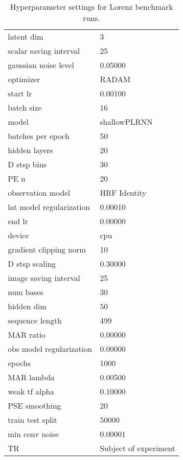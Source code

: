 \begin{table}
\centering
\caption{Hyperparameter settings for Lorenz benchmark runs.}
\label{tab:args lorenz runs}
\begin{tabular}{ll}
\toprule
\midrule
latent dim & 3 \\
scalar saving interval & 25 \\
gaussian noise level & 0.05000 \\
optimizer & RADAM \\
start lr & 0.00100 \\
batch size & 16 \\
model & shallowPLRNN \\
batches per epoch & 50 \\
hidden layers & 20 \\
D stsp bins & 30 \\
PE n & 20 \\
observation model & HRF Identity \\
lat model regularization & 0.00010 \\
end lr & 0.00000 \\
device & cpu \\
gradient clipping norm & 10 \\
D stsp scaling & 0.30000 \\
image saving interval & 25 \\
num bases & 30 \\
hidden dim & 50 \\
sequence length & 499 \\
MAR ratio & 0.00000 \\
obs model regularization & 0.00000 \\
epochs & 1000 \\
MAR lambda & 0.00500 \\
weak tf alpha & 0.10000 \\
PSE smoothing & 20 \\
train test split & 50000 \\
min conv noise & 0.00001 \\
TR & Subject of experiment \\
\bottomrule
\end{tabular}
\end{table}
